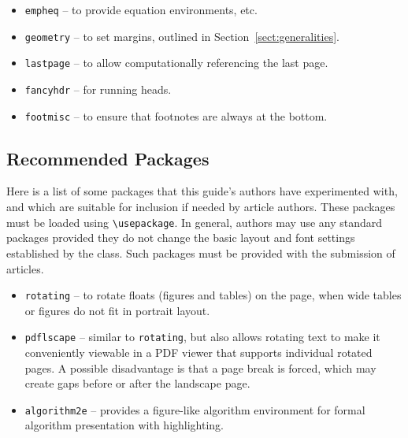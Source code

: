 \documentclass{easychair}
\newcommand{\easychair}{\sf{easychair}}
\begin{document}
\begin{itemize}
\item
\texttt{empheq} \cite{empheq-package} -- to provide equation environments, etc.

\item
\texttt{geometry} \cite{geometry-package} -- to set {\easychair} margins, 
outlined in Section~\ref{sect:generalities}.

\item
\texttt{lastpage} \cite{lastpage-package} -- to allow computationally
referencing the last page.

\item
\texttt{fancyhdr} \cite{fancyhdr-package} -- for running heads.

\item
\texttt{footmisc} \cite{footmisc-package} -- to ensure that footnotes are
always at the bottom.

\end{itemize}

\subsection{Recommended Packages}
\label{sect:recommended-packages}

Here is a list of some packages that this guide's authors have experimented 
with, and which are suitable for inclusion if needed by article authors.
These packages must be loaded using \verb+\usepackage+.
In general, authors may use any standard packages provided they do not change
the basic layout and font settings established by the {\easychair} class.
Such packages must be provided with the submission of articles.

\begin{itemize}
\item
\texttt{rotating} \cite{rotating-package} -- to rotate floats (figures and
tables) on the page, when wide tables or figures do not fit in portrait layout.

\item
\texttt{pdflscape} \cite{pdflscape-package} -- similar to \texttt{rotating}, 
but also allows rotating text to make it conveniently viewable in a PDF 
viewer that supports individual rotated pages.
A possible disadvantage is that a page break is forced, which may create
gaps before or after the landscape page.

\item
\texttt{algorithm2e} \cite{algorithm2e-package} -- provides a figure-like
algorithm environment for formal algorithm presentation with highlighting.

\end{itemize}
\end{document}
